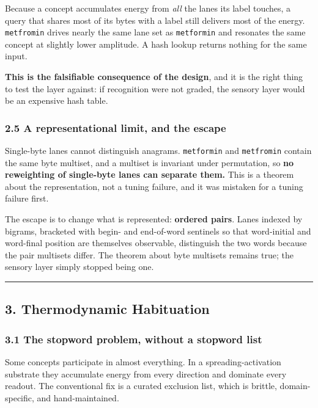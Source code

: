\documentclass[
  11pt,
  a4paper,
]{article}
\begin{document}
Because a concept accumulates energy from \emph{all} the lanes its label
touches, a query that shares most of its bytes with a label still
delivers most of the energy. \texttt{metfromin} drives nearly the same
lane set as \texttt{metformin} and resonates the same concept at
slightly lower amplitude. A hash lookup returns nothing for the same
input.

\textbf{This is the falsifiable consequence of the design}, and it is
the right thing to test the layer against: if recognition were not
graded, the sensory layer would be an expensive hash table.

\subsubsection{2.5 A representational limit, and the
escape}\label{a-representational-limit-and-the-escape}

Single-byte lanes cannot distinguish anagrams. \texttt{metformin} and
\texttt{metfromin} contain the same byte multiset, and a multiset is
invariant under permutation, so \textbf{no reweighting of single-byte
lanes can separate them.} This is a theorem about the representation,
not a tuning failure, and it was mistaken for a tuning failure first.

The escape is to change what is represented: \textbf{ordered pairs}.
Lanes indexed by bigrams, bracketed with begin- and end-of-word
sentinels so that word-initial and word-final position are themselves
observable, distinguish the two words because the pair multisets differ.
The theorem about byte multisets remains true; the sensory layer simply
stopped being one.

\begin{center}\rule{0.5\linewidth}{0.5pt}\end{center}

\subsection{3. Thermodynamic
Habituation}\label{thermodynamic-habituation}

\subsubsection{3.1 The stopword problem, without a stopword
list}\label{the-stopword-problem-without-a-stopword-list}

Some concepts participate in almost everything. In a
spreading-activation substrate they accumulate energy from every
direction and dominate every readout. The conventional fix is a curated
exclusion list, which is brittle, domain-specific, and hand-maintained.
\end{document}
